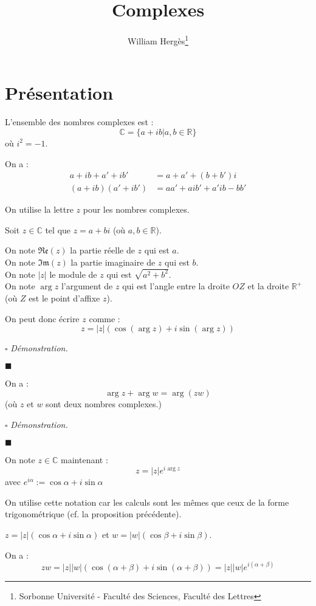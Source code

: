 \documentclass[a4paper, titlepage]{article}
\title{Complexes}
\author{William Hergès\thanks{Sorbonne Université - Faculté des Sciences, Faculté des Lettres}}
\renewenvironment{proof}{$\square$ \footnotesize\textit{Démonstration.}}{\begin{flushright}$\blacksquare$\end{flushright}}
\begin{document}
	\maketitle
	\tableofcontents
	\newpage
	\section{Présentation}
	\begin{defn}
		L'ensemble des nombres complexes est : $$ \mathbb{C} = \{a+ib|a,b\in\mathbb{R}\} $$
		où $i^2 = -1$.

		On a :
		\begin{align*}
			a+ib+a'+ib' &= a+a'+(b+b')i \\
			(a+ib)(a'+ib') &= aa'+aib'+a'ib-bb'
		\end{align*}
	\end{defn}
	On utilise la lettre $z$ pour les nombres complexes.
	\begin{defn}
		Soit $z\in\mathbb{C}$ tel que $z=a+bi$ (où $a,b\in\mathbb{R}$).

		On note $\mathfrak{Re}(z)$ la partie réelle de $z$ qui est $a$.\\
		On note $\mathfrak{Im}(z)$ la partie imaginaire de $z$ qui est $b$.\\
		On note $|z|$ le module de $z$ qui est $\sqrt{a^2+b^2}$.\\
		On note $\arg z$ l'argument de $z$ qui est l'angle entre la droite $OZ$ et la droite $\mathbb{R}^+$ (où $Z$ est le point d'affixe $z$).
	\end{defn}
	\begin{props}
		On peut donc écrire $z$ comme :
		$$ z = |z|(\cos(\arg z)+i\sin(\arg z)) $$
	\end{props}
	\begin{proof}
		\AQT
	\end{proof}
	\begin{props}
		On a :
		$$ \arg z + \arg w = \arg(zw) $$
		(où $z$ et $w$ sont deux nombres complexes.)
	\end{props}
	\begin{proof}
		\AQT
	\end{proof}
	\begin{defn}
		On note $z\in\mathbb{C}$ maintenant :
		$$ z = |z|e^{i\arg z} $$
		avec $e^{i\alpha} := \cos\alpha+i\sin\alpha$
	\end{defn}
	On utilise cette notation car les calculs sont les mêmes que ceux de la forme trigonométrique (cf. la proposition précédente).
	\begin{exemple}
		$z=|z|(\cos\alpha+i\sin\alpha)$ et $w=|w|(\cos\beta+i\sin\beta)$.

		On a :
		$$ zw = |z||w|(\cos(\alpha+\beta)+i\sin(\alpha+\beta)) = |z||w|e^{i(\alpha+\beta)} $$
	\end{exemple}
\end{document}
